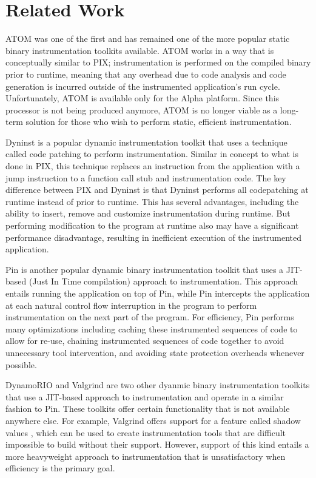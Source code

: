 \section{Related Work}

ATOM \cite{srivastava1994atom} was one of the first and has remained one of the more popular static binary instrumentation toolkits
available. ATOM works in a way that is conceptually similar to PIX; instrumentation is performed on the compiled
binary prior to runtime, meaning that any overhead due to code analysis and code generation is incurred outside of
the instrumented application's run cycle. Unfortunately, ATOM is available only for the Alpha platform. Since this
processor is not being produced anymore, ATOM is no longer viable as a long-term solution for those who wish to
perform static, efficient instrumentation. 

Dyninst \cite{buck2000api} is a popular dynamic instrumentation toolkit that uses a technique called code patching
to perform instrumentation. Similar in concept to what is done in PIX, this technique replaces an
instruction from the application with a jump instruction to a function call stub and
instrumentation code. The key difference between PIX and Dyninst is that Dyninst performs all codepatching
at runtime instead of prior to runtime. This has several advantages, including the ability to insert, remove
and customize instrumentation during runtime. But performing modification to the program at runtime also
may have a significant performance disadvantage, resulting in inefficient execution of the instrumented application.

Pin \cite{luk2005pin} is another popular dynamic binary instrumentation toolkit that uses a JIT-based (Just In Time compilation) approach to
instrumentation. This approach entails running the application on top of Pin, while Pin intercepts the
application at each natural control flow interruption in the program to perform instrumentation on the next part of the
program. For efficiency, Pin performs many optimizations including caching these instrumented sequences of code to allow for
re-use, chaining instrumented sequences of code together to avoid unnecessary tool intervention, and avoiding state protection
overheads whenever possible.

DynamoRIO \cite{bruening2004efficent} and Valgrind \cite{nethercote2007valgrind} are two other dyanmic
binary instrumentation toolkits that use a JIT-based approach to instrumentation and operate in a similar fashion
to Pin. These toolkits offer certain functionality that is not available anywhere else. For example, Valgrind offers
support for a feature called shadow values \cite{nethercote2007shadow}, 
which can be used to create instrumentation tools that are difficult impossible to build without
their support. However, support of this kind entails a more heavyweight approach to instrumentation that is
unsatisfactory when efficiency is the primary goal.
